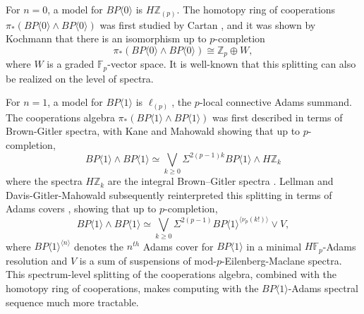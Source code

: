 \documentclass{amsart}
\theoremstyle{plain}
\numberwithin{theorem}{section}
\numberwithin{equation}{section}
\numberwithin{figure}{section}
\newcommand{\0}{\langle 0 \rangle }
\begin{document}
For $n=0$, a model for $BP\langle 0 \rangle$ is $H\mathbb{Z}_{(p)}$. The homotopy ring of cooperations \newline $\pi_*(BP \langle 0 \rangle \wedge BP \langle 0 \rangle)$
was first studied by Cartan \cite{Cartan1954-1955}, and it was shown by Kochmann \cite{Kochman82} that there is an isomorphism up to $p$-completion
\[\pi_*(BP \langle 0 \rangle \wedge BP \langle 0 \rangle ) \cong \mathbb{Z}_p \oplus W,\] 
where $W$ is a graded $\mathbb{F}_p$-vector space. It is well-known that this splitting can also be realized on the level of spectra. 

For $n=1$, a model for $BP \langle 1 \rangle$ is $\ell_{(p)}$, the $p$-local connective Adams summand. The cooperations algebra $\pi_*(BP \langle 1 \rangle \wedge BP \langle 1 \rangle )$ was first described in terms of Brown-Gitler spectra, with Kane and Mahowald \cite{kane1981operations, Mahowald81} showing that up to $p$-completion, 
\[BP \langle 1 \rangle \wedge BP \langle 1 \rangle \simeq \bigvee_{k \geq 0} \Sigma^{2(p-1)k}BP \langle 1 \rangle \wedge H\mathbb{Z}_k\]
where the spectra $H\mathbb{Z}_k$ are the integral Brown--Gitler spectra \cite{goerss1986some}. Lellman and Davis-Gitler-Mahowald subsequently reinterpreted this splitting in terms of Adams covers \cite{lellmann1984operations, davis1981stable}, showing that up to $p$-completion,
\begin{equation}\label{intro classical splitting}
BP \langle 1 \rangle \wedge BP \langle 1 \rangle \simeq \bigvee_{k \geq 0}\Sigma^{2(p-1)}BP \langle 1 \rangle^{\langle\nu_p(k!)\rangle} \vee V,\end{equation}
where $BP \langle 1 \rangle ^{\langle n \rangle}$ denotes the $n^{th}$ Adams cover for $BP \langle 1 \rangle$ in a minimal $H\mathbb{F}_p$-Adams resolution and $V$ is a sum of suspensions of mod-$p$-Eilenberg-Maclane spectra. This spectrum-level splitting of the cooperations algebra, combined with the homotopy ring of cooperations, makes computing with the $BP\langle 1\rangle$-Adams spectral sequence much more tractable.
\end{document}

